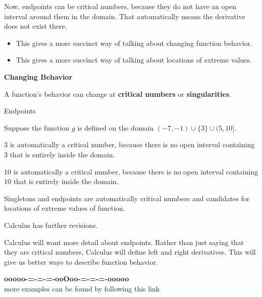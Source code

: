 \documentclass{ximera}
\begin{document}
Now, endpoints can be critical numbers, because they do not have an open interval around them in the domain.  That automatically means the derivative does not exist there. 






\begin{itemize}
\item This gives a more succinct way of talking about changing function behavior. 
\item This gives a more succinct way of talking about locations of extreme values. 
\end{itemize}




\begin{idea} \textbf{\textcolor{blue!55!black}{Changing Behavior}} 


A function's behavior can change at \textbf{critical numbers} or \textbf{singularities}.






\end{idea}


\begin{example} Endpoints


Suppose the function $g$ is defined on the domain $(-7, -1) \cup \{ 3 \} \cup (5, 10]$.

$3$ is automatically a critical number, because there is no open interval containing $3$ that is entirely inside the domain.

$10$ is automatically a critical number, because there is no open interval containing $10$ that is entirely inside the domain.



Singletons and endpoints are automatically critical numbers and candidates for locations of extreme values of function. 



\end{example}



Calculus has further revisions.

Calculus will want more detail about endpoints.  Rather than just saying that they are critical numbers, Calculus will define left and right derivatives.  This will give us better ways to describe function behavior. 













\begin{center}
\textbf{\textcolor{green!50!black}{ooooo-=-=-=-ooOoo-=-=-=-ooooo}} \\

more examples can be found by following this link\\ 

\end{center}
\end{document}
